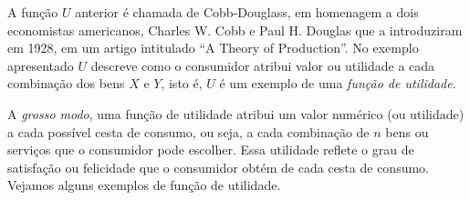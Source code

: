 A função $U$ anterior é chamada de Cobb-Douglass, em homenagem a dois economistas americanos, Charles W. Cobb e Paul H. Douglas que a introduziram em 1928, em um artigo intitulado ``A Theory of Production''. No exemplo apresentado $U$ descreve como o consumidor atribui valor ou utilidade a cada combinação dos bens $X$ e $Y$, isto é, $U$ é um exemplo de uma \textit{função de utilidade}.  

A \textit{grosso modo}, uma função de utilidade atribui um valor numérico (ou utilidade) a cada possível cesta de consumo, ou seja, a cada combinação de $n$ bens ou serviços que o consumidor pode escolher. Essa utilidade reflete o grau de satisfação ou felicidade que o consumidor obtém de cada cesta de consumo. Vejamos alguns exemplos de função de utilidade. 

